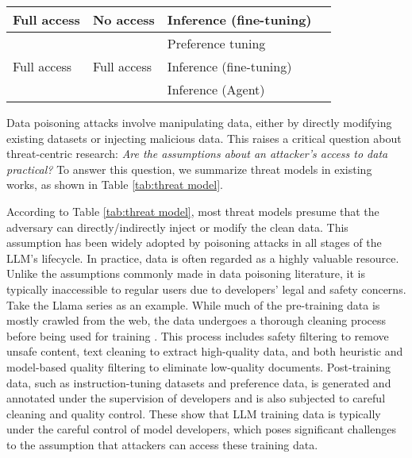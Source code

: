 \begin{table*}[t]
{\begin{tabular}{l|l|l|l}
Full access                       & No access                    & Inference (fine-tuning)      &  \citep{halawi2024covert, huang2024harmful,   bowen2024data}                                                \\ \hline
\multirow{3}{*}{Full   access}    & \multirow{3}{*}{Full access} & Preference tuning            &  \citep{shi2023badgpt, wang2024trojan}                                                                      \\ \cline{3-4} 
                                  &                              & Inference   (fine-tuning)    &  \citep{kandpal2023backdoor, bowen2024data,   li2024backdoorllm, liu2024loraasanattackpiercingllmsafety}    \\ \cline{3-4} 
                                  &                              & Inference (Agent)            &  \citep{wang2024badagent, yang2402watch}                                                                    \\ \hline
\end{tabular}}
\end{table*}

Data poisoning attacks involve manipulating data, either by directly modifying existing datasets or injecting malicious data. This raises a critical question about threat-centric research: \textit{Are the assumptions about an attacker's access to data practical?}
To answer this question, we summarize threat models in existing works, as shown in Table \ref{tab:threat model}. 

According to Table \ref{tab:threat model}, most threat models presume that the adversary can directly/indirectly inject or modify the clean data. This assumption has been widely adopted by poisoning attacks in all stages of the LLM's lifecycle.
In practice, data is often regarded as a highly valuable resource. Unlike the assumptions commonly made in data poisoning literature, it is typically inaccessible to regular users due to developers' legal and safety concerns. Take the Llama series \citep{touvron2023llama, dubey2024llama} as an example. 
While much of the pre-training data is mostly crawled from the web, the data undergoes a thorough cleaning process before being used for training \citep{dubey2024llama}. This process includes safety filtering to remove unsafe content, text cleaning to extract high-quality data, and both heuristic and model-based quality filtering to eliminate low-quality documents. Post-training data, such as instruction-tuning datasets and preference data, is generated and annotated under the supervision of developers and is also subjected to careful cleaning and quality control. These show that LLM training data is typically under the careful control of model developers, which poses significant challenges to the assumption that attackers can access these training data. 

